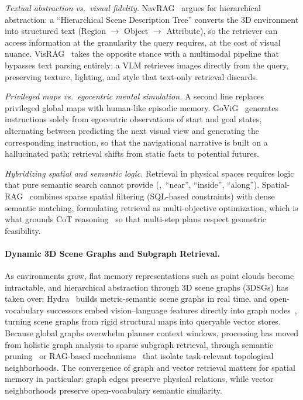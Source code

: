 \emph{Textual abstraction vs.\ visual fidelity.} NavRAG~\cite{wang2025navrag} argues for hierarchical abstraction: a ``Hierarchical Scene Description Tree'' converts the 3D environment into structured text (Region $\rightarrow$ Object $\rightarrow$ Attribute), so the retriever can access information at the granularity the query requires, at the cost of visual nuance. VisRAG~\cite{yu2024visrag} takes the opposite stance with a multimodal pipeline that bypasses text parsing entirely: a VLM retrieves images directly from the query, preserving texture, lighting, and style that text-only retrieval discards.

\emph{Privileged maps vs.\ egocentric mental simulation.} A second line replaces privileged global maps with human-like episodic memory. GoViG~\cite{wu2025govig} generates instructions solely from egocentric observations of start and goal states, alternating between predicting the next visual view and generating the corresponding instruction, so that the navigational narrative is built on a hallucinated path; retrieval shifts from static facts to potential futures.

\emph{Hybridizing spatial and semantic logic.} Retrieval in physical spaces requires logic that pure semantic search cannot provide (\eg,\ ``near'', ``inside'', ``along''). Spatial-RAG~\cite{yu2025spatial} combines sparse spatial filtering (SQL-based constraints) with dense semantic matching, formulating retrieval as multi-objective optimization, which is what grounds CoT reasoning~\cite{liu2023retrieval} so that multi-step plans respect geometric feasibility.

\paragraph{Dynamic 3D Scene Graphs and Subgraph Retrieval.}
As environments grow, flat memory representations such as point clouds become intractable, and hierarchical abstraction through 3D scene graphs (3DSGs) has taken over: Hydra~\cite{hughes2022hydra} builds metric-semantic scene graphs in real time, and open-vocabulary successors embed vision--language features directly into graph nodes~\cite{gu2024conceptgraphs}, turning scene graphs from rigid structural maps into queryable vector stores. Because global graphs overwhelm planner context windows, processing has moved from holistic graph analysis to sparse subgraph retrieval, through semantic pruning~\cite{rana2023sayplan} or RAG-based mechanisms~\cite{xie2024embodiedrag} that isolate task-relevant topological neighborhoods. The convergence of graph and vector retrieval matters for spatial memory in particular: graph edges preserve physical relations, while vector neighborhoods preserve open-vocabulary semantic similarity.

